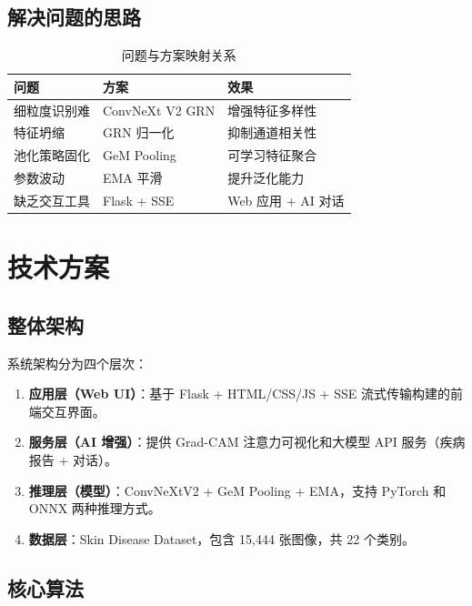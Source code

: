 \documentclass[12pt,a4paper]{report}
\begin{document}
\section{解决问题的思路}

\begin{table}[H]
    \centering
    \caption{问题与方案映射关系}
    \label{tab:problem_solution}
    \begin{tabular}{l l l}
        \toprule
        \textbf{问题} & \textbf{方案} & \textbf{效果} \\
        \midrule
        细粒度识别难 & ConvNeXt V2 GRN & 增强特征多样性 \\
        特征坍缩 & GRN 归一化 & 抑制通道相关性 \\
        池化策略固化 & GeM Pooling & 可学习特征聚合 \\
        参数波动 & EMA 平滑 & 提升泛化能力 \\
        缺乏交互工具 & Flask + SSE & Web 应用 + AI 对话 \\
        \bottomrule
    \end{tabular}
\end{table}

\chapter{技术方案}

\section{整体架构}

系统架构分为四个层次：

\begin{enumerate}[leftmargin=2em, itemsep=0.3em]
    \item \textbf{应用层（Web UI）}：基于 Flask + HTML/CSS/JS + SSE 流式传输构建的前端交互界面。
    \item \textbf{服务层（AI 增强）}：提供 Grad-CAM 注意力可视化和大模型 API 服务（疾病报告 + 对话）。
    \item \textbf{推理层（模型）}：ConvNeXtV2 + GeM Pooling + EMA，支持 PyTorch 和 ONNX 两种推理方式。
    \item \textbf{数据层}：Skin Disease Dataset，包含 15,444 张图像，共 22 个类别。
\end{enumerate}

\section{核心算法}
\end{document}
